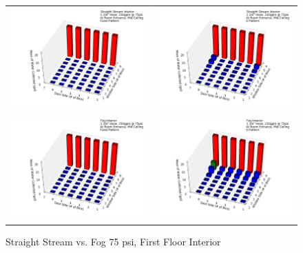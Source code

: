 \documentclass{article}
\begin{document}
\begin{appendices}
\clearpage

\begin{figure}[ht]
\begin{tabular*}{\textwidth}{lr}
\includegraphics[width=3.2in]{../ADD_Analysis/Figures/15-12-09_115707_Datafile_Straight_Stream_Interior.png} &
\includegraphics[width=3.2in]{../ADD_Analysis/Figures/15-12-09_120229_Datafile_Straight_Stream_Interior.png} \\
\includegraphics[width=3.2in]{../ADD_Analysis/Figures/15-12-09_120821_Datafile_Fog_Interior.png} &
\includegraphics[width=3.2in]{../ADD_Analysis/Figures/15-12-09_121309_Datafile_Fog_Interior.png} \\
\end{tabular*}
\caption{Straight Stream vs. Fog 75 psi, First Floor Interior}
\label{fig:Straight Stream vs. Fog 75 psi, First Floor Interior}
\end{figure}


\end{appendices}
\end{document}
